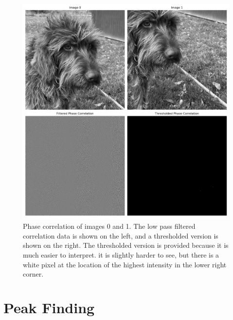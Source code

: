 \documentclass[]{article}
\begin{document}
	\begin{figure}[H]
		\centering
		\includegraphics[width=6.5in]{p2_output/phase_correlation_low_pass.png}
		\caption{Phase correlation of images 0 and 1. The low pass filtered correlation data is shown on the left, and a thresholded version is shown on the right. The thresholded version is provided because it is much easier to interpret. it is slightly harder to see, but there is a white pixel at the location of the highest intensity in the lower right corner.}
	\end{figure}

\newpage
\section{Peak Finding}	
\end{document}
